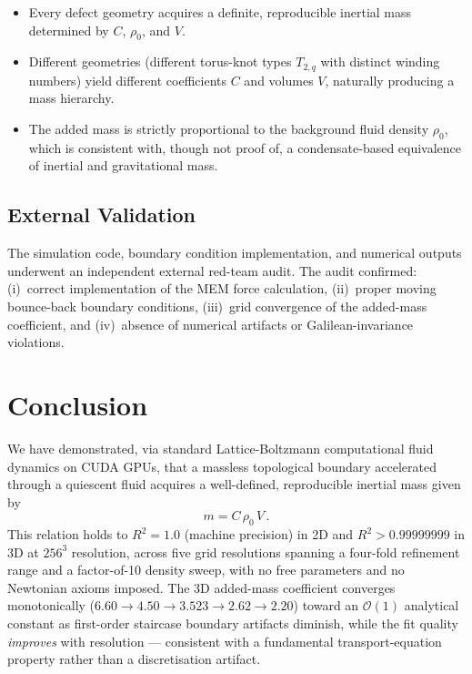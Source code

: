 \documentclass[reprint,amsmath,amssymb,aps,pre,floatfix]{revtex4-2}
\begin{document}
\begin{itemize}
\item Every defect geometry acquires a definite, reproducible inertial mass
  determined by $C$, $\rho_0$, and $V$.
\item Different geometries (different torus-knot types $T_{2,q}$ with
  distinct winding numbers) yield different coefficients $C$ and volumes
  $V$, naturally producing a mass hierarchy.
\item The added mass is strictly proportional to the background fluid density
  $\rho_0$, which is consistent with, though not proof of, a condensate-based
  equivalence of inertial and gravitational mass.
\end{itemize}

\subsection{External Validation}
\label{sec:audit}

The simulation code, boundary condition implementation, and numerical
outputs underwent an independent external red-team audit.  The audit
confirmed: (i)~correct implementation of the MEM force calculation,
(ii)~proper moving bounce-back boundary conditions, (iii)~grid convergence
of the added-mass coefficient, and (iv)~absence of numerical artifacts or
Galilean-invariance violations.

\section{Conclusion}
\label{sec:conclusion}

We have demonstrated, via standard Lattice-Boltzmann computational fluid
dynamics on CUDA GPUs, that a massless topological boundary accelerated
through a quiescent fluid acquires a well-defined, reproducible inertial
mass given by
\begin{equation}
m = C\,\rho_0\,V\,.
\label{eq:conclusion}
\end{equation}
This relation holds to $R^{2}=1.0$ (machine precision) in 2D and
$R^{2}>0.99999999$ in 3D at $256^{3}$ resolution, across five grid
resolutions spanning a four-fold refinement range and a factor-of-10
density sweep, with no free parameters and no Newtonian axioms imposed.
The 3D added-mass coefficient converges monotonically
($6.60\to4.50\to3.523\to2.62\to2.20$) toward an $\mathcal{O}(1)$
analytical constant as first-order staircase boundary artifacts diminish,
while the fit quality \emph{improves} with resolution --- consistent with
a fundamental transport-equation property rather than a discretisation artifact.
\end{document}
